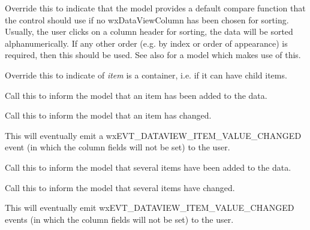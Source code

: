 
Override this to indicate that the model provides a default compare
function that the control should use if no wxDataViewColumn has been
chosen for sorting. Usually, the user clicks on a column header for
sorting, the data will be sorted alphanumerically. If any other
order (e.g. by index or order of appearance) is required, then this
should be used. See also 
for a model which makes use of this.

\label{wxdataviewmodeliscontainer}


Override this to indicate of {\it item} is a container, i.e. if
it can have child items.

\label{wxdataviewmodelitemadded}


Call this to inform the model that an item has been added
to the data.

\label{wxdataviewmodelitemchanged}


Call this to inform the model that an item has changed.

This will eventually emit a wxEVT\_DATAVIEW\_ITEM\_VALUE\_CHANGED
event (in which the column fields will not be set) to the user. 

\label{wxdataviewmodelitemsadded}


Call this to inform the model that several items have been added
to the data.

\label{wxdataviewmodelitemschanged}


Call this to inform the model that several items have changed.

This will eventually emit wxEVT\_DATAVIEW\_ITEM\_VALUE\_CHANGED
events (in which the column fields will not be set) to the user. 

